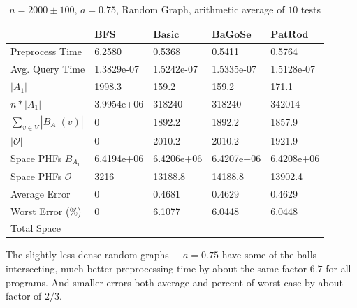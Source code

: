 \documentclass[shortabstract, lic, english]{iithesis}
\theoremstyle{definition} \newtheorem{definition}{Definition}[chapter]
\theoremstyle{remark} \newtheorem{remark}[definition]{Observation}
\theoremstyle{plain} \newtheorem{theorem}[definition]{Theorem}
\theoremstyle{plain} \newtheorem{lemma}[definition]{Lemma}
\theoremstyle{plain} \newtheorem{conjecture}[definition]{Conjecture}
\begin{document}
\begin{table}[H] \label{test:random.a0.75}
    \centering
    \begin{tabular}{ |p{3cm}||p{2cm}|p{2cm}|p{2cm}|p{2cm}|  } 
        \hline
        & $\mathbf{BFS}$ & $\mathbf{Basic}$ & $\mathbf{BaGoSe}$ & $\mathbf{PatRod}$ \\
        \hline
        \hline
        Preprocess Time                 & 6.2580     & 0.5368     & 0.5411      & 0.5764     \\
        \hline
        Avg. Query Time                 & 1.3829e-07 & 1.5242e-07 & 1.5335e-07  & 1.5128e-07 \\
        \hline
        $|A_1|$                         & 1998.3     & 159.2      &  159.2      & 171.1      \\
        \hline
        $n * |A_1|$                     & 3.9954e+06 & 318240     &  318240     & 342014     \\
        \hline
        $\sum_{v \in V} |B_{A_1}(v)| $  & 0          & 1892.2     & 1892.2      & 1857.9     \\
        \hline
        $|\mathcal{O}|$                 & 0          & 2010.2     & 2010.2      & 1921.9     \\
        \hline
        Space PHFs $B_{A_1}$            & 6.4194e+06 & 6.4206e+06 & 6.4207e+06  & 6.4208e+06 \\
        \hline
        Space PHFs $\mathcal{O}$        & 3216       & 13188.8    & 14188.8     & 13902.4    \\
        \hline
        Average Error                   & 0          & 0.4681     & 0.4629      & 0.4629     \\
        \hline
        Worst Error (\%)                & 0          & 6.1077     & 6.0448      & 6.0448     \\
        \hline
        Total Space                     &            &            &             &            \\
        \hline

    \end{tabular}
    \caption{$n = 2000 \pm 100$, $a = 0.75$, Random Graph, arithmetic average of $10$ tests}
\end{table}

The slightly less dense random graphs $-$ $a=0.75$ have some of the balls intersecting, much better preprocessing time by about the same factor $6.7$ for all programs.
And smaller errors both average and percent of worst case by about factor of $2/3$.
\end{document}
